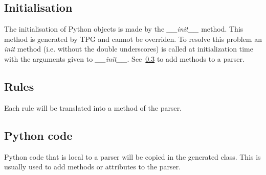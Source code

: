\subsection{Initialisation}

The initialisation of Python objects is made by the \emph{\_\_init\_\_} method.
This method is generated by TPG and cannot be overriden.
To resolve this problem an \emph{init} method (i.e. without the double underscores) is called at initialization time with the arguments given to \emph{\_\_init\_\_}.
See~\ref{grammar:python_code} to add methods to a parser.

\subsection{Rules}

Each rule will be translated into a method of the parser.

\subsection{Python code}									\label{grammar:python_code}

Python code that is local to a parser will be copied in the generated class.
This is usually used to add methods or attributes to the parser.
